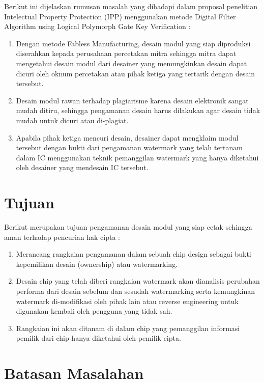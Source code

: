 Berikut ini dijelaskan rumusan masalah yang dihadapi dalam proposal
penelitian Intelectual Property Protection (IPP) menggunakan metode Digital Filter Algorithm using Logical Polymorph Gate Key Verification :

\begin{enumerate}
	\item Dengan metode Fabless Manufacturing, desain modul yang siap
	diproduksi diserahkan kepada perusahaan percetakan mitra sehingga
	mitra dapat mengetahui desain modul dari desainer yang
	memungkinkan desain dapat dicuri oleh oknum percetakan atau pihak
	ketiga yang tertarik dengan desain tersebut.
	 
	\item Desain modul rawan terhadap plagiarisme karena desain elektronik
	sangat mudah ditiru, sehingga pengamanan desain harus dilakukan agar
	desain tidak mudah untuk dicuri atau di-plagiat.
	
	\item Apabila pihak ketiga mencuri desain, desainer dapat mengklaim modul
	tersebut dengan bukti dari pengamanan watermark yang telah tertanam
	dalam IC menggunakan teknik pemanggilan watermark yang hanya
	diketahui oleh desainer yang mendesain IC tersebut.
\end{enumerate}

\section{Tujuan}

Berikut merupakan tujuan pengamanan desain modul yang siap cetak
sehingga aman terhadap pencurian hak cipta :
\begin{enumerate}
	\item Merancang rangkaian pengamanan dalam sebuah chip design sebagai
	bukti kepemilikan desain (ownership) atau watermarking.
	
	\item Desain chip yang telah diberi rangkaian watermark akan dianalisis
	perubahan performa dari desain sebelum dan sesudah watermarking
	serta kemungkinan watermark di-modifikasi oleh pihak lain atau
	reverse engineering untuk digunakan kembali oleh pengguna yang tidak
	sah.
	
	\item Rangkaian ini akan ditanam di dalam chip yang pemanggilan informasi
	pemilik dari chip hanya diketahui oleh pemilik cipta.
\end{enumerate}

\section{Batasan Masalahan}

